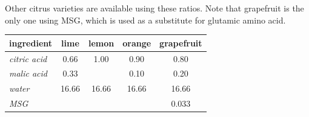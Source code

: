 \begin{variation}
\item Other citrus varieties are available using these ratios\cite{superJuiceKosGrapefruit}\cite{superJuiceKos}.
    Note that grapefruit is the only one using \acrshort{MSG}, which is used as a substitute for glutamic amino acid\cite{superJuiceKosGrapefruitYT}.
    \begin{center}
        \begin{tabular}{lSSSS}\toprule
            \textbf{ingredient}     &  \textbf{lime} & \textbf{lemon} & \textbf{orange} & \textbf{grapefruit} \\ \midrule
            \textit{citric acid}    &           0.66 &           1.00 &            0.90 &                0.80 \\
            \textit{malic acid}     &           0.33 &                &            0.10 &                0.20 \\
            \textit{water}          &          16.66 &          16.66 &           16.66 &               16.66 \\
            \textit{\acrshort{MSG}} &                &                &                 &               0.033 \\ \bottomrule
    \end{tabular}
    \end{center}
\end{variation}

\recipeend%
